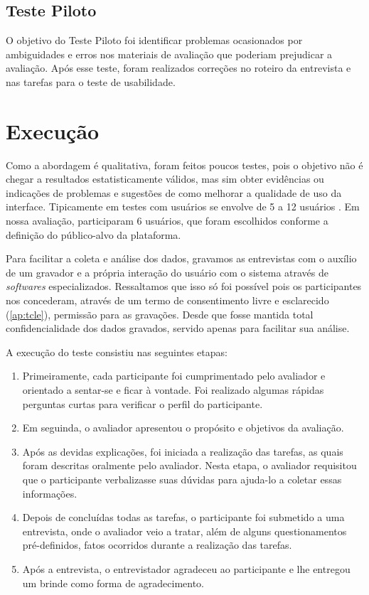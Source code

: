 \subsection{Teste Piloto}

O objetivo do Teste Piloto foi identificar problemas ocasionados por ambiguidades e erros nos materiais de avaliação que poderiam prejudicar a avaliação. Após esse teste, foram realizados correções no roteiro da entrevista e nas tarefas para o teste de usabilidade.

\section{Execução}

Como a abordagem é qualitativa, foram feitos poucos testes, pois o objetivo não é chegar a resultados estatisticamente válidos, mas sim obter evidências ou indicações de problemas e sugestões de como melhorar a qualidade de uso da interface. Tipicamente em testes com usuários se envolve de 5 a 12 usuários \cite{dumas1999practical}. Em nossa avaliação, participaram 6 usuários, que foram escolhidos conforme a definição do público-alvo da plataforma.

Para facilitar a coleta e análise dos dados, gravamos as entrevistas com o auxílio de um gravador e a própria interação do usuário com o sistema através de \textit{softwares} especializados. Ressaltamos que isso só foi possível pois os participantes nos concederam, através de um termo de consentimento livre e esclarecido (\autoref{ap:tcle}), permissão para as gravações. Desde que fosse mantida total confidencialidade dos dados gravados, servido apenas para facilitar sua análise.

A execução do teste consistiu nas seguintes etapas:
\begin{enumerate}
	\item Primeiramente, cada participante foi cumprimentado pelo avaliador e orientado a sentar-se e ficar à vontade. Foi realizado algumas rápidas perguntas curtas para verificar o perfil do participante.
	\item Em seguinda, o avaliador apresentou o propósito e objetivos da avaliação.   
	\item Após as devidas explicações, foi iniciada a realização das tarefas, as quais foram descritas oralmente pelo avaliador. Nesta etapa, o avaliador requisitou que o participante verbalizasse suas dúvidas para ajuda-lo a coletar essas informações.
	\item Depois de concluídas todas as tarefas, o participante foi submetido a uma entrevista, onde o avaliador veio a tratar, além de alguns questionamentos pré-definidos, fatos ocorridos durante a realização das tarefas.
	\item Após a entrevista, o entrevistador agradeceu ao participante e lhe entregou um brinde como forma de agradecimento.  
\end{enumerate}

